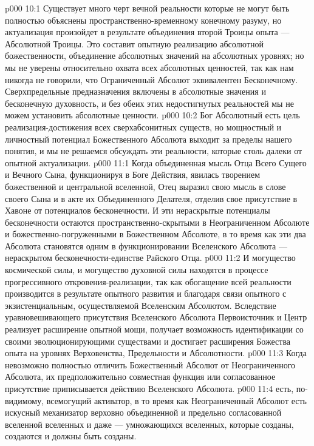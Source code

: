 \vs p000 10:1 Существует много черт вечной реальности  которые не могут быть полностью объяснены пространственно\hyp{}временному конечному разуму, но актуализация  произойдет в результате объединения второй Троицы опыта --- Абсолютной Троицы. Это составит опытную реализацию абсолютной божественности, объединение абсолютных значений на абсолютных уровнях; но мы не уверены относительно охвата всех абсолютных ценностей, так как нам никогда не говорили, что Ограниченный Абсолют эквивалентен Бесконечному. Сверхпредельные предназначения включены в абсолютные значения и бесконечную духовность, и без обеих этих недостигнутых реальностей мы не можем установить абсолютные ценности.
\vs p000 10:2 Бог Абсолютный есть цель реализация\hyp{}достижения всех сверхабсонитных существ, но мощностный и личностный потенциал Божественного Абсолюта выходит за пределы нашего понятия, и мы не решаемся обсуждать эти реальности, которые столь далеки от опытной актуализации.
\vs p000 11:1 Когда объединенная мысль Отца Всего Сущего и Вечного Сына, функционируя в Боге Действия, явилась творением божественной и центральной вселенной, Отец выразил свою мысль в слове своего Сына и в акте их Объединенного Делателя, отделив свое присутствие в Хавоне от потенциалов бесконечности. И эти нераскрытые потенциалы бесконечности остаются пространственно\hyp{}скрытыми в Неограниченном Абсолюте и божественно\hyp{}погруженными в Божественном Абсолюте, в то время как эти два Абсолюта становятся одним в функционировании Вселенского Абсолюта --- нераскрытом бесконечности\hyp{}единстве Райского Отца.
\vs p000 11:2 И могущество космической силы, и могущество духовной силы находятся в процессе прогрессивного откровения\hyp{}реализации, так как обогащение всей реальности производится в результате опытного развития и благодаря связи опытного с экзистенциальным, осуществляемой Вселенским Абсолютом. Вследствие уравновешивающего присутствия Вселенского Абсолюта Первоисточник и Центр реализует расширение опытной мощи, получает возможность идентификации со своими эволюционирующими существами и достигает расширения Божества опыта на уровнях Верховенства, Предельности и Абсолютности.
\vs p000 11:3 \pc Когда невозможно полностью отличить Божественный Абсолют от Неограниченного Абсолюта, их предположительно совместная функция или согласованное присутствие приписывается действию Вселенского Абсолюта.
\vs p000 11:4 \bibnobreakspace {} есть, по\hyp{}видимому, всемогущий активатор, в то время как Неограниченный Абсолют есть искусный механизатор верховно объединенной и предельно согласованной вселенной вселенных и даже --- умножающихся вселенных, которые созданы, создаются и должны быть созданы.
